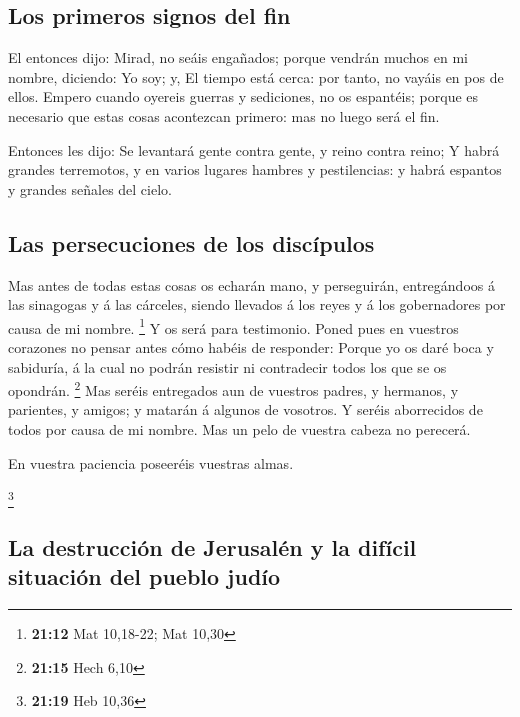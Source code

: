 \hypertarget{los-primeros-signos-del-fin}{%
\subsection{Los primeros signos del
fin}\label{los-primeros-signos-del-fin}}

 El entonces dijo: Mirad, no seáis engañados; porque vendrán
muchos en mi nombre, diciendo: Yo soy; y, El tiempo está cerca: por
tanto, no vayáis en pos de ellos.  Empero cuando oyereis
guerras y sediciones, no os espantéis; porque es necesario que estas
cosas acontezcan primero: mas no luego será el fin.

 Entonces les dijo: Se levantará gente contra gente, y
reino contra reino;  Y habrá grandes terremotos, y en
varios lugares hambres y pestilencias: y habrá espantos y grandes
señales del cielo.

\hypertarget{las-persecuciones-de-los-discuxedpulos}{%
\subsection{Las persecuciones de los
discípulos}\label{las-persecuciones-de-los-discuxedpulos}}

 Mas antes de todas estas cosas os echarán mano, y
perseguirán, entregándoos á las sinagogas y á las cárceles, siendo
llevados á los reyes y á los gobernadores por causa de mi nombre.
\footnote{\textbf{21:12} Mat 10,18-22; Mat 10,30}  Y os
será para testimonio.  Poned pues en vuestros corazones no
pensar antes cómo habéis de responder:  Porque yo os daré
boca y sabiduría, á la cual no podrán resistir ni contradecir todos los
que se os opondrán. \footnote{\textbf{21:15} Hech 6,10} 
Mas seréis entregados aun de vuestros padres, y hermanos, y parientes, y
amigos; y matarán á algunos de vosotros.  Y seréis
aborrecidos de todos por causa de mi nombre.  Mas un pelo
de vuestra cabeza no perecerá.

 En vuestra paciencia poseeréis vuestras almas.

\footnote{\textbf{21:19} Heb 10,36}

\hypertarget{la-destrucciuxf3n-de-jerusaluxe9n-y-la-difuxedcil-situaciuxf3n-del-pueblo-juduxedo}{%
\subsection{La destrucción de Jerusalén y la difícil situación del
pueblo
judío}\label{la-destrucciuxf3n-de-jerusaluxe9n-y-la-difuxedcil-situaciuxf3n-del-pueblo-juduxedo}}

